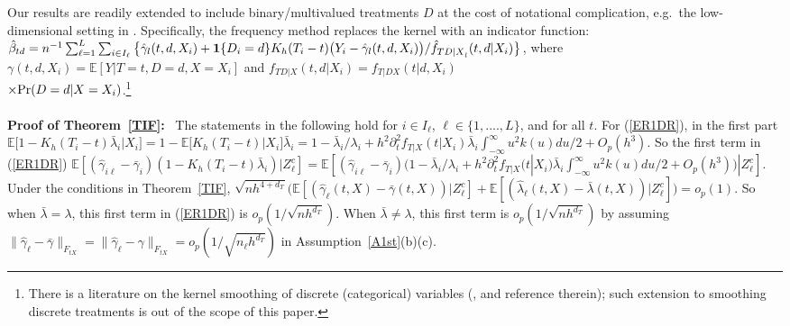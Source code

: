 \documentclass[lettersize, 12pt]{article}
\begin{document}
Our results are readily extended to include binary/multivalued treatments $D$ at the cost of notational complication, e.g.\ the low-dimensional setting in \cite{Cattaneo10JoE}.
Specifically, the frequency method replaces the kernel with an indicator function:
 $\hat \beta_{td} = n^{-1} \sum_{\ell=1}^L \sum_{i \in I_\ell} \big\{ \hat \gamma_l(t, d, X_i) + {\bf 1}\{D_i = d\} K_h(T_i - t)\big( Y_i - \hat \gamma_l(t, d, X_i)\big)/ \hat f_{{TD|X}_l}(t, d|X_i)\big\}$, where $\gamma(t, d, X_i) = \mathbb{E}[Y|T=t, D=d, X=X_i]$
and 
$f_{TD|X}(t, d|X_i) = f_{T|DX}(t|d, X_i)$\\$\times {\rm Pr}(D=d|X=X_i)$.\footnote{
There is a literature on the kernel smoothing of discrete (categorical) variables (\cite{AA}, \cite{OLR} and reference therein); such extension to smoothing discrete treatments is out of the scope of this paper.}
\\
\\
\textbf{Proof of Theorem~\ref{TIF}:}\
The statements in the following hold for $i \in I_\ell$, $\ell\in\{1,...., L\}$, and for all $t$.
For (\ref{ER1DR}), 
in the first part $
\mathbb{E}\big[ 1 -K_h(T_i - t) \bar{\lambda}_i \big|X_i\big] 
= 1- \mathbb{E}\big[K_h(T_i - t) \big|X_i\big] \bar{\lambda}_i
= 1 - \bar{\lambda}_i/\lambda_i + h^2 \partial_t^2 f_{T|X}(t|X_i) \bar{\lambda}_i \int_{-\infty}^\infty u^2k(u) du/2  + O_p(h^3)$.
So the first term in (\ref{ER1DR})
$\mathbb{E}[ (\hat \gamma_{i\ell} - \bar \gamma_i)(1-K_h(T_i - t) \bar \lambda_i)|Z_\ell^c] 
=\mathbb{E}[(\hat\gamma_{i\ell} - \bar{\gamma}_i)
(1 - \bar{\lambda}_i/\lambda_i + h^2 \partial_t^2 f_{T|X}(t|X_i) \bar{\lambda}_i \int_{-\infty}^\infty u^2k(u) du/2  + O_p(h^3))
|Z_\ell^c]$.
Under the conditions in Theorem~\ref{TIF}, $ \sqrt{nh^{4+d_T}}\big(\mathbb{E}[(\hat \gamma_\ell(t, X) - \bar \gamma(t, X) )|Z_\ell^c ]  + \mathbb{E}[ ( \hat \lambda_\ell(t,X) - \bar \lambda(t,X) )|Z_\ell^c]  \big)= o_p(1)$.
So when $\bar\lambda = \lambda$, this first term in (\ref{ER1DR}) is $o_p(1/\sqrt{n h^{d_T}})$.
When $\bar\lambda \neq \lambda$, 
this first term is $o_p(1/\sqrt{n h^{d_T}})$ by assuming $\|\hat\gamma_{\ell} - \bar{\gamma}\|_{F_{tX}} = \|\hat\gamma_{\ell} - {\gamma}\|_{F_{tX}} = o_p(1/\sqrt{n_\ell h^{d_T}})$
 in Assumption~\ref{A1st}(b)(c).
\end{document}
